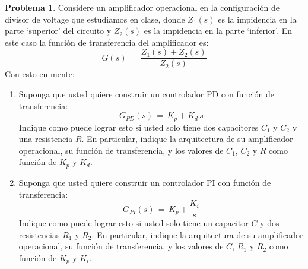 \documentclass[ a4paper, twoside, 11pt]{article}
\theoremstyle{definition}
\newtheorem{problem}[definition]{Problema}
\begin{document}
\begin{problem}
Considere un amplificador operacional en la configuraci\'on de divisor de voltage que estudiamos en clase, donde $Z_1(s)$ es la impidencia en la parte `superior' del circuito y $Z_2(s)$ es la impidencia en la parte `inferior'. En este caso la funci\'on de transferencia del amplificador es: 
\[
G(s) \, = \, \frac{Z_1(s) + Z_2(s)}{Z_2(s)}
\]
Con esto en mente: 
\begin{enumerate}[label=\alph*.]
\item Suponga que usted quiere construir un controlador PD con funci\'on de transferencia: 
\[
G_{PD}(s) \, = \, K_p + K_d \, s
\]
Indique como puede lograr esto si usted solo tiene dos capacitores $C_1$ y $C_2$ y una resistencia $R$. En particular, indique la arquitectura de su amplificador operacional, \linebreak su funci\'on de transferencia, y los valores de $C_1$, $C_2$ y $R$ como funci\'on de $K_p$ y $K_d$. 
\item Suponga que usted quiere construir un controlador PI con funci\'on de transferencia: 
\[
G_{PI}(s) \, = \, K_p + \frac{K_i}{s}
\]
Indique como puede lograr esto si usted solo tiene un capacitor $C$ y dos resistencias $R_1$ y $R_2$. En particular, indique la arquitectura de su amplificador operacional, \linebreak su funci\'on de transferencia, y los valores de $C$, $R_1$ y $R_2$ como funci\'on de $K_p$ y $K_i$. 

\end{enumerate}


\end{problem}
\vspace{\baselineskip}
\end{document}
